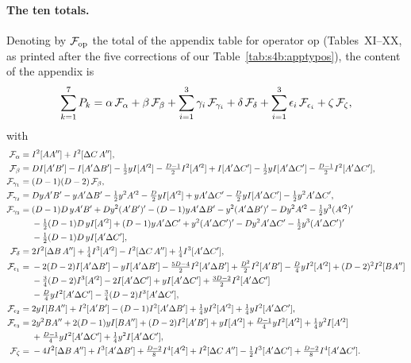 \documentclass[aps,prd,onecolumn,10pt,nofootinbib,floatfix]{revtex4-2}
\begin{document}
\paragraph*{The ten totals.}
Denoting by $\mathcal{F}_{\rm op}$ the total of the appendix table for operator op (Tables~XI--XX, as printed after the
five corrections of our Table~\ref{tab:s4b:apptypos}), the content of the appendix is
\begin{equation}
\sum_{k=1}^7P_k=\alpha\,\mathcal{F}_\alpha+\beta\,\mathcal{F}_\beta+\sum_{i=1}^3\gamma_i\,\mathcal{F}_{\gamma_i}+\delta\,\mathcal{F}_\delta
+\sum_{i=1}^3\epsilon_i\,\mathcal{F}_{\epsilon_i}+\zeta\,\mathcal{F}_\zeta ,
\label{eq:s4b:decomp}
\end{equation}
with
\begin{align}
\mathcal{F}_\alpha={}&I^2[AA'']+I^2[\Delta C\,A''],\nonumber\\
\mathcal{F}_\beta={}&DI[A'B']-I[A'\Delta B']-\tfrac12yI[A'^2]-\tfrac{D-1}{2}I^2[A'^2]+I[A'\Delta C']-\tfrac12yI[A'\Delta C']
-\tfrac{D-1}{2}I^2[A'\Delta C'],\nonumber\\
\mathcal{F}_{\gamma_1}={}&(D-1)(D-2)\,\mathcal{F}_\beta,\nonumber\\
\mathcal{F}_{\gamma_2}={}&DyA'B'-yA'\Delta B'-\tfrac12y^2A'^2-\tfrac D2yI[A'^2]+yA'\Delta C'-\tfrac D2yI[A'\Delta C']
-\tfrac12y^2A'\Delta C',\nonumber\\
\mathcal{F}_{\gamma_3}={}&(D-1)D\,yA'B'+Dy^2(A'B')'-(D-1)yA'\Delta B'-y^2(A'\Delta B')'-Dy^2A'^2-\tfrac12y^3(A'^2)'\nonumber\\
&-\tfrac12(D-1)D\,yI[A'^2]+(D-1)yA'\Delta C'+y^2(A'\Delta C')'-Dy^2A'\Delta C'-\tfrac12y^3(A'\Delta C')'\nonumber\\
&-\tfrac12(D-1)D\,yI[A'\Delta C'],\nonumber\\
\mathcal{F}_\delta={}&2I^2[\Delta B\,A'']+\tfrac14I^3[A'^2]-I^2[\Delta C\,A'']+\tfrac14I^3[A'\Delta C'],\label{eq:s4b:totals}\\
\mathcal{F}_{\epsilon_1}={}&-2(D-2)I[A'\Delta B']-yI[A'\Delta B']-\tfrac{5D-4}{2}I^2[A'\Delta B']+\tfrac{D^2}{2}I^2[A'B']
-\tfrac D4yI^2[A'^2]+(D-2)^2I^2[BA'']\nonumber\\
&-\tfrac34(D-2)I^3[A'^2]-2I[A'\Delta C']+yI[A'\Delta C']+\tfrac{3D-2}{2}I^2[A'\Delta C']\nonumber\\
&-\tfrac D4yI^2[A'\Delta C']-\tfrac34(D-2)I^3[A'\Delta C'],\nonumber\\
\mathcal{F}_{\epsilon_2}={}&2yI[BA'']+I^2[A'B']-(D-1)I^2[A'\Delta B']+\tfrac14yI^2[A'^2]+\tfrac14yI^2[A'\Delta C'],\nonumber\\
\mathcal{F}_{\epsilon_3}={}&2y^2BA''+2(D-1)yI[BA'']+(D-2)I^2[A'B']+yI[A'^2]+\tfrac{D-1}{4}yI^2[A'^2]+\tfrac14y^2I[A'^2]\nonumber\\
&+\tfrac{D-1}{4}yI^2[A'\Delta C']+\tfrac14y^2I[A'\Delta C'],\nonumber\\
\mathcal{F}_\zeta={}&-4I^2[\Delta B\,A'']+I^3[A'\Delta B']+\tfrac{D-2}{8}I^4[A'^2]+I^2[\Delta C\,A'']-\tfrac12I^3[A'\Delta C']
+\tfrac{D-2}{8}I^4[A'\Delta C'].\nonumber
\end{align}
\end{document}
